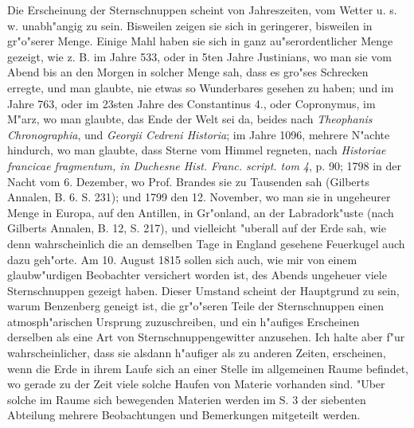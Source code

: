\documentclass[a4paper, 11pt, oneside, polutonikogreek, german]{article}
\begin{document}
Die Erscheinung der Sternschnuppen scheint von Jahreszeiten, vom Wetter u. s. w. unabh"angig zu sein. Bisweilen zeigen sie sich in geringerer, bisweilen in gr"o"serer Menge. Einige Mahl haben sie sich in ganz au"serordentlicher Menge gezeigt, wie z. B. im Jahre 533, oder in 5ten Jahre Justinians, wo man sie vom Abend bis an den Morgen in solcher Menge sah, dass es gro"ses Schrecken erregte, und man glaubte, nie etwas so Wunderbares gesehen zu haben; und im Jahre 763, oder im 23sten Jahre des Constantinus 4., oder Copronymus, im M"arz, wo man glaubte, das Ende der Welt sei da, beides nach \emph{Theophanis Chronographia}, und \emph{Georgii Cedreni Historia}; im Jahre 1096, mehrere N"achte hindurch, wo man glaubte, dass Sterne vom Himmel regneten, nach \emph{Historiae francicae fragmentum, in Duchesne Hist. Franc. script. tom 4}, p. 90; 1798 in der Nacht vom 6. Dezember, wo Prof. Brandes sie zu Tausenden sah (Gilberts Annalen, B. 6. S. 231); und 1799 den 12. November, wo man sie in ungeheurer Menge in Europa, auf den Antillen, in Gr"onland, an der Labradork"uste (nach Gilberts Annalen, B. 12, S. 217), und vielleicht "uberall auf der Erde sah, wie denn wahrscheinlich die an demselben Tage in England gesehene Feuerkugel auch dazu geh"orte. Am 10. August 1815 sollen sich auch, wie mir von einem glaubw"urdigen Beobachter versichert worden ist, des Abends ungeheuer viele Sternschnuppen gezeigt haben. Dieser Umstand scheint der Hauptgrund zu sein, warum Benzenberg geneigt ist, die gr"o"seren Teile der Sternschnuppen einen atmosph"arischen Ursprung zuzuschreiben, und ein h"aufiges Erscheinen derselben als eine Art von Sternschnuppengewitter anzusehen. Ich halte aber f"ur wahrscheinlicher, dass sie alsdann h"aufiger als zu anderen Zeiten, erscheinen, wenn die Erde in ihrem Laufe sich an einer Stelle im allgemeinen Raume befindet, wo gerade zu der Zeit viele solche Haufen von Materie vorhanden sind. "Uber solche im Raume sich bewegenden Materien werden im S. 3 der siebenten Abteilung mehrere Beobachtungen und Bemerkungen mitgeteilt werden.
\end{document}

